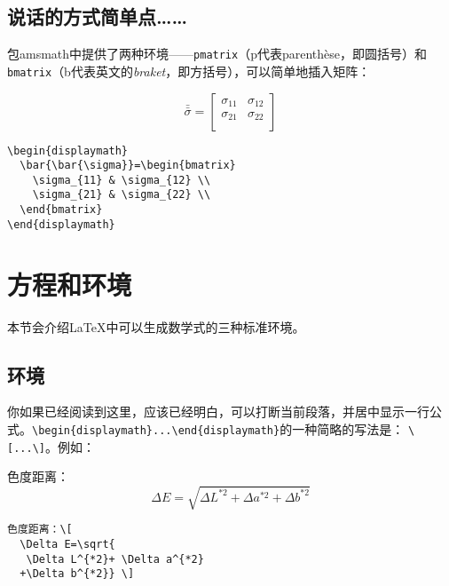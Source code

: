 \subsection{说话的方式简单点……}

包\textsf{amsmath}中提供了两种环境——\verb|pmatrix|（p代表parenthèse，即圆括号）和\verb|bmatrix|（b代表英文的\emph{braket}，即方括号），可以简单地插入矩阵：

\begin{codelist}[3.19]{
  \begin{displaymath}
    \bar{\bar{\sigma}}=\begin{bmatrix}
      \sigma_{11} & \sigma_{12} \\
      \sigma_{21} & \sigma_{22} \\
    \end{bmatrix}
  \end{displaymath}
}
\begin{verbatim}
\begin{displaymath}
  \bar{\bar{\sigma}}=\begin{bmatrix}
    \sigma_{11} & \sigma_{12} \\
    \sigma_{21} & \sigma_{22} \\
  \end{bmatrix}
\end{displaymath}\end{verbatim}
\end{codelist}

\section{方程和环境}

本节会介绍\LaTeX 中可以生成数学式的三种标准环境。

\subsection{环境}

你如果已经阅读到这里，应该已经明白，可以打断当前段落，并居中显示一行公式。\verb|\begin{displaymath}...\end{displaymath}|的一种简略的写法是：
\verb|\[...\]|。例如：

\begin{codelist}[3.20]{
  色度距离：\[
  \Delta E=\sqrt{
   \Delta L^{*2}+ \Delta a^{*2}
  +\Delta b^{*2}} \]
}
\begin{verbatim}
色度距离：\[
  \Delta E=\sqrt{
   \Delta L^{*2}+ \Delta a^{*2}
  +\Delta b^{*2}} \]\end{verbatim}
\end{codelist}

